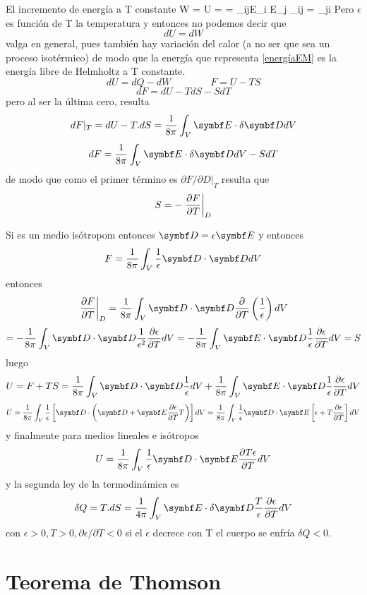 \documentclass[10pt,oneside]{CBFT_book}
\begin{document}
El incremento de energía a T constante
\be
	\delta W = U =  \cdot{} =  \epsilon_{ij}E_i E_j	\qquad
	 \; \epsilon_{ij} = \epsilon_{ji} \; 
	\label{energíaEM}
\ee
Pero $\epsilon$ es función de T la temperatura y entonces no podemos decir que
\[
	dU = dW
\]
valga en general, pues también hay variación del calor (a no ser que sea un proceso isotérmico) de modo que 
la energía que representa \eqref{energíaEM} es la energía libre de Helmholtz a T constante.
\[
	dU = dQ - dW \qquad \qquad F = U - TS
\]
\[
	dF = dU - TdS - SdT
\]
pero al ser la última cero, resulta
\[
	dF|_T = dU - T.dS = \frac{1}{8\pi} \int_V \vb{E}\cdot\delta\vb{D} dV
\]
\[
	dF = \frac{1}{8\pi} \int_V \vb{E}\cdot\delta\vb{D} dV - SdT
\]
de modo que como el primer término es $\partial F / \partial D |_T$ resulta que 
\[
	S = -\left.\frac{\partial^{\hspace{-0.05em}} {F}}{\partial {T}^{\hspace{-0.05em}}}\right|_D
\]

Si es un medio isótropom entonces $\vb{D} = \epsilon \vb{E}$ y entonces 
\[
	F = \frac{1}{8\pi} \int_V \frac{1}{\epsilon}\vb{D}\cdot\vb{D} dV
\]
entonces
\[
	\left.\dpar{F}{T}\right|_D	= \frac{1}{8\pi} \int_V \vb{D}\cdot\vb{D} \frac{\partial}{\partial T}
		\left( \frac{1}{\epsilon} \right) dV
\]
\[
	=  - \frac{1}{8\pi} \int_V \vb{D}\cdot\vb{D} \frac{1}{\epsilon^2} \dpar{\epsilon}{T}  dV =
	-\frac{1}{8\pi} \int_V \vb{E}\cdot\vb{D} \frac{1}{\epsilon} \dpar{\epsilon}{T}  dV = S
\]
luego 
\[
	U = F + TS = \frac{1}{8\pi} \int_V \vb{D}\cdot\vb{D} \frac{1}{\epsilon} dV  +
	\frac{1}{8\pi} \int_V \vb{E}\cdot\vb{D} \frac{1}{\epsilon} \dpar{\epsilon}{T}  dV 
\]
\[
	U = \frac{1}{8\pi} \int_V \frac{1}{\epsilon} \left[ \vb{D}\cdot \left( \vb{D} + 
		\vb{E} \dpar{\epsilon}{T} T \right) \right] dV  = \frac{1}{8\pi} \int_V \frac{1}{\epsilon}
		\vb{D}\cdot \vb{E} \left[ \epsilon + T \dpar{\epsilon}{T}  \right] dV
\]
y finalmente para medios lineales e isótropos
\[
	U = \frac{1}{8\pi} \int_V \frac{1}{\epsilon} \vb{D}\cdot \vb{E} \dpar{ T \epsilon}{T} dV
\]
y la segunda ley de la termodinámica es
\[
	\delta Q = T.dS = \frac{1}{4\pi} \int_V \vb{E}\cdot\delta\vb{D} \frac{T}{\epsilon}
	\dpar{\epsilon}{T} dV
\]
con $\epsilon > 0, T > 0, \partial \epsilon / \partial T < 0$ si el $\epsilon$ decrece con T el cuerpo
se enfría $\delta Q < 0$.


\section{Teorema de Thomson}
\end{document}
